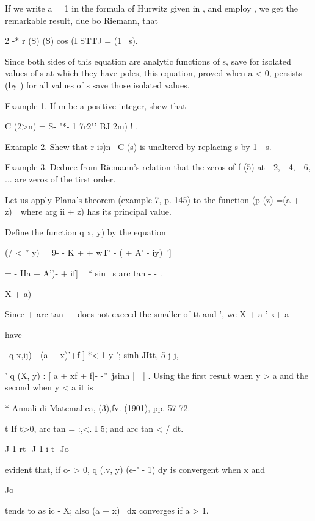 If we write a = 1 in the formula of Hurwitz given in , and
employ , we get the remarkable result, due bo Riemann, that

2 -* r (S) (S) cos (I STTJ = (1 \ s).

Since both sides of this equation are analytic functions of s, save
for isolated values of s at which they have poles, this equation,
proved when a < 0, persists (by ) for all values of s save those
isolated values.

Example 1. If m be a positive integer, shew that

C (2>n) = S- "*- 1 7r2"' BJ 2m) ! .

Example 2. Shew that r is)n~ C (s) is unaltered by replacing s by 1 -
s.


Example 3. Deduce from Riemann's relation that the zeros of f (5) at -
2, - 4, - 6, ... are zeros of the tirst order.


Let us apply Plana's theorem (example 7, p. 145) to the function (p
(z) =(a + z)~\ where arg ii + z) has its principal value.

Define the function q x, y) by the equation

(/ < '' y) = 9- - K + + wT' - ( + A' - iy)~']

= - Ha + A')- + if] ~ * sin \ s arc tan - - .

  X + a)

Since + arc tan - - does not exceed the smaller of tt and ', we X + a
' x+ a

have

\ q x,ij)\ \ (a + x)'+f-] *< 1 y-'; sinh JItt, 5 j j,

' q (X, y) : [ a + xf + f]- -''\ jsinh | | | . Using the first result
when y > a and the second when y < a it is

* Annali di Matemalica, (3),fv. (1901), pp. 57-72.

t If t>0, arc tan = :,<. I 5; and arc tan < / dt.

J 1-rt- J 1-i-t- Jo

%
%

evident that, if o- > 0, q (.v, y) (e-" - 1) dy is convergent when x
and

Jo

tends to as ic - X; also (a + x)~ dx converges if a > 1.

